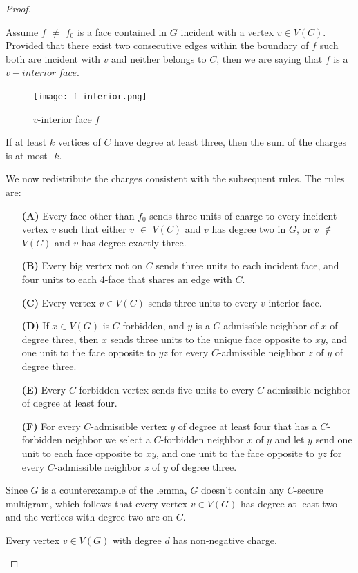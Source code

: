 \begin{proof}
\begin{definition}
Assume $f$ $\neq$ $f_0$ is a face contained in $G$ incident with a vertex $v \in V(C)$. Provided that there exist two consecutive edges within the boundary of $f$ such both are incident with $v$ and neither belongs to $C$, then we are saying that $f$ is a $v-interior \
face$.
\end{definition}

\begin{figure}[H] %
\centering %
\texttt{[image: f-interior.png]} 
\caption{$v$-interior face $f$} %
\label{figure} %
\end{figure}

\begin{corollary}
If at least $k$ vertices of $C$ have degree at least three, then the sum of the
charges is at most -$k$.
\end{corollary}

We now redistribute the charges consistent with the subsequent rules.
The rules are:\cite{dvorak2013threecoloring}
\begin{itemize}
    \item[\textbf{(A)}] Every face other than $f_0$ sends three units of charge to every incident vertex $v$ such that either $v$ $\in$ $V(C)$ and $v$ has degree two in $G$, or $v$ $\notin$ $V(C)$ and $v$ has degree exactly three.
    \item[\textbf{(B)}] Every big vertex not on $C$ sends three units to each incident face, and
four units to each 4-face that shares an edge with $C$.
\item[\textbf{(C)}] Every vertex $v \in V(C)$ sends three units to every $v$-interior face.
\item[\textbf{(D)}] If $x \in V(G)$ is $C$-forbidden, and $y$ is a $C$-admissible neighbor of $x$ of
degree three, then $x$ sends three units to the unique face opposite to $xy$,
and one unit to the face opposite to $yz$ for every $C$-admissible neighbor
$z$ of $y$ of degree three.
\item[\textbf{(E)}] Every $C$-forbidden vertex sends five units to every $C$-admissible neighbor
of degree at least four.
\item[\textbf{(F)}] For every $C$-admissible vertex $y$ of degree at least four that has a $C$-forbidden neighbor we select a $C$-forbidden neighbor $x$ of $y$ and let $y$
send one unit to each face opposite to $xy$, and one unit to the face
opposite to $yz$ for every $C$-admissible neighbor $z$ of $y$ of degree three.
\end{itemize}
Since $G$ is a counterexample of the lemma, $G$ doesn't contain any $C$-secure multigram, which follows that every vertex $v \in V(G)$ has degree at least two and the vertices with degree two are on $C$. 
\begin{claim}
Every vertex $v \in V(G)$ with degree $d$ has non-negative charge.
\end{claim}


\end{proof}
